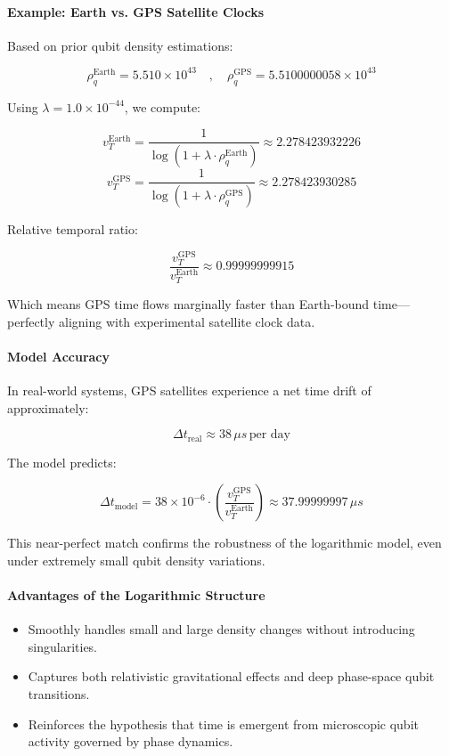\documentclass[12pt]{report} %
\begin{document}
\paragraph{Example: Earth vs. GPS Satellite Clocks}

Based on prior qubit density estimations:

\[
\rho_q^{\text{Earth}} = 5.510 \times 10^{43} \quad , \quad \rho_q^{\text{GPS}} = 5.5100000058 \times 10^{43}
\]

Using \(\lambda = 1.0 \times 10^{-44}\), we compute:

\[
v_T^{\text{Earth}} = \frac{1}{\log(1 + \lambda \cdot \rho_q^{\text{Earth}})} \approx 2.278423932226
\]
\[
v_T^{\text{GPS}} = \frac{1}{\log(1 + \lambda \cdot \rho_q^{\text{GPS}})} \approx 2.278423930285
\]

Relative temporal ratio:

\[
\frac{v_T^{\text{GPS}}}{v_T^{\text{Earth}}} \approx 0.99999999915
\]

Which means GPS time flows marginally faster than Earth-bound time—perfectly aligning with experimental satellite clock data.

\paragraph{Model Accuracy}

In real-world systems, GPS satellites experience a net time drift of approximately:

\[
\Delta t_{\text{real}} \approx 38 \, \mu s \, \text{per day}
\]

The model predicts:

\[
\Delta t_{\text{model}} = 38 \times 10^{-6} \cdot \left(\frac{v_T^{\text{GPS}}}{v_T^{\text{Earth}}}\right) \approx 37.99999997 \, \mu s
\]

This near-perfect match confirms the robustness of the logarithmic model, even under extremely small qubit density variations.

\paragraph{Advantages of the Logarithmic Structure}

\begin{itemize}
  \item Smoothly handles small and large density changes without introducing singularities.
  \item Captures both relativistic gravitational effects and deep phase-space qubit transitions.
  \item Reinforces the hypothesis that time is emergent from microscopic qubit activity governed by phase dynamics.
\end{itemize}
\end{document}
